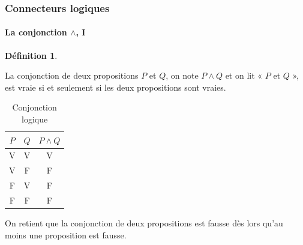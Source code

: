 \documentclass[10pt,notheorems]{beamer}
\theoremstyle{plain}
\theoremstyle{definition} %
\newtheorem{definition}{Définition}
\begin{document}
  \begin{frame}
    \frametitle{Connecteurs logiques}
    \framesubtitle{La conjonction $\land$, I}
    \hypertarget{slide_conjonction_1}{}

    \begin{definition}\label{def:conjonction}

    La conjonction de deux propositions $P$ et $Q$, on note $P\land Q$
    et on lit « $P$ et $Q$ », est vraie si et seulement si les
    deux propositions sont vraies.
  \end{definition}

  \bigskip

  \begin{table}[H]

    \centering
    \begin{tabular}[H]{|cc|c|}
      \hline
      $P$ & $Q$ & $P \land Q$\\ \hline
      V & V & V \\
      V & F & F \\
      F & V & F \\
      F & F & F \\
      \hline\hline
    \end{tabular}
    \caption{Conjonction logique}
    \label{tab:conjonction}
  \end{table}

  \bigskip

  On retient que la conjonction de deux propositions est fausse dès
  lors qu'au moins une proposition est fausse.

  \end{frame}
\end{document}
